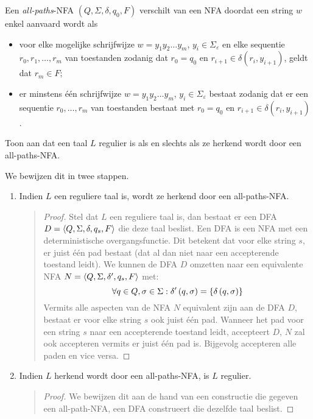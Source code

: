 \documentclass[a4paper]{article}
\begin{document}
\begin{question}
Een \emph{all-paths}-NFA $(Q,\Sigma,\delta,q_0,F)$ verschilt van een NFA doordat een string $w$ enkel aanvaard wordt als 
\begin{itemize}
  \item voor elke mogelijke schrijfwijze $w = y_1 y_2 \ldots y_m$, $y_i \in \Sigma_{\varepsilon}$ en elke sequentie $r_0, r_1, \ldots, r_m$ van toestanden zodanig dat $r_0 = q_0$ en $r_{i+1} \in \delta(r_i,y_{i+1})$, geldt dat $r_m \in F$;
  \item er minstens \'e\'en schrijfwijze $w = y_1 y_2 \ldots y_m$, $y_i \in \Sigma_{\varepsilon}$ bestaat zodanig dat er een sequentie $r_0, \ldots, r_m$ van toestanden bestaat met $r_0 = q_0$ en $r_{i+1} \in \delta(r_i,y_{i+1})$.
\end{itemize}
Toon aan dat een taal $L$ regulier is als en slechts als ze herkend wordt door een all-paths-NFA.
\begin{answer}
We bewijzen dit in twee stappen.
\begin{enumerate}
 \item Indien $L$ een reguliere taal is, wordt ze herkend door een all-paths-NFA.
\begin{quotation}
\begin{proof}
Stel dat $L$ een reguliere taal is, dan bestaat er een DFA $D=\left\langle Q,\Sigma,\delta,q_s,F \right\rangle$ die deze taal beslist. Een DFA is een NFA met een deterministische overgangsfunctie. Dit betekent dat voor elke string $s$, er juist \'e\'en pad bestaat (dat al dan niet naar een accepterende toestand leidt). We kunnen de DFA $D$ omzetten naar een equivalente NFA $N=\left\langle Q,\Sigma,\delta',q_s,F \right\rangle$ met:
\begin{equation}
\forall q\in Q,\sigma\in\Sigma:\delta'\left( q,\sigma \right)=\left\{ \delta\left( q,\sigma \right) \right\}
\end{equation}
Vermits alle aspecten van de NFA $N$ equivalent zijn aan de DFA $D$, bestaat er voor elke string $s$ ook juist \'e\'en pad. Wanneer het pad voor een string $s$ naar een accepterende toestand leidt, accepteert $D$, $N$ zal ook accepteren vermits er juist \'e\'en pad is. Bijgevolg accepteren alle paden en vice versa.
\end{proof}
\end{quotation}
\item Indien $L$ herkend wordt door een all-paths-NFA, is $L$ regulier.
\begin{quotation}
\begin{proof}
We bewijzen dit aan de hand van een constructie die gegeven een all-path-NFA, een DFA construeert die dezelfde taal beslist.

\end{proof}
\end{quotation}
\end{enumerate}
\end{answer}
\end{question}
\end{document}
